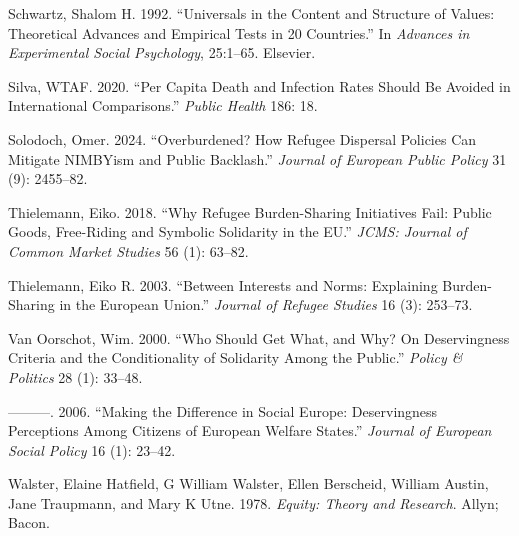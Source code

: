 \documentclass[
  12pt,
  a4paper,
]{article}
\newlength{\cslhangindent}
\newenvironment{CSLReferences}[2] %
 {\begin{list}{}{%
  \setlength{\itemindent}{0pt}
  \setlength{\leftmargin}{0pt}
  \setlength{\parsep}{0pt}
  \ifodd #1
   \setlength{\leftmargin}{\cslhangindent}
   \setlength{\itemindent}{-1\cslhangindent}
  \fi
  \setlength{\itemsep}{#2\baselineskip}}}
 {\end{list}}
\begin{document}
\begin{CSLReferences}{1}{0}
Schwartz, Shalom H. 1992. {``Universals in the Content and Structure of Values: Theoretical Advances and Empirical Tests in 20 Countries.''} In \emph{Advances in Experimental Social Psychology}, 25:1--65. Elsevier.

Silva, WTAF. 2020. {``Per Capita Death and Infection Rates Should Be Avoided in International Comparisons.''} \emph{Public Health} 186: 18.

Solodoch, Omer. 2024. {``Overburdened? How Refugee Dispersal Policies Can Mitigate NIMBYism and Public Backlash.''} \emph{Journal of European Public Policy} 31 (9): 2455--82.

Thielemann, Eiko. 2018. {``Why Refugee Burden-Sharing Initiatives Fail: Public Goods, Free-Riding and Symbolic Solidarity in the EU.''} \emph{JCMS: Journal of Common Market Studies} 56 (1): 63--82.

Thielemann, Eiko R. 2003. {``Between Interests and Norms: Explaining Burden-Sharing in the European Union.''} \emph{Journal of Refugee Studies} 16 (3): 253--73.

Van Oorschot, Wim. 2000. {``Who Should Get What, and Why? On Deservingness Criteria and the Conditionality of Solidarity Among the Public.''} \emph{Policy \& Politics} 28 (1): 33--48.

---------. 2006. {``Making the Difference in Social Europe: Deservingness Perceptions Among Citizens of European Welfare States.''} \emph{Journal of European Social Policy} 16 (1): 23--42.

Walster, Elaine Hatfield, G William Walster, Ellen Berscheid, William Austin, Jane Traupmann, and Mary K Utne. 1978. \emph{Equity: Theory and Research}. Allyn; Bacon.

\end{CSLReferences}
\end{document}
